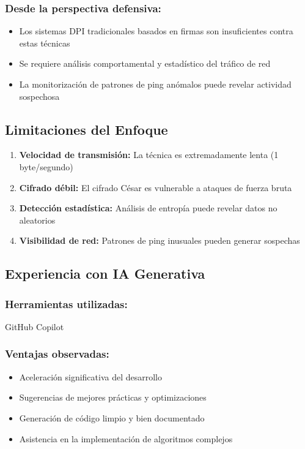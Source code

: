 \documentclass[letter,12pt]{article}
\begin{document}
\subsubsection*{Desde la perspectiva defensiva:}
\begin{itemize}
    \item Los sistemas DPI tradicionales basados en firmas son insuficientes contra estas técnicas
    \item Se requiere análisis comportamental y estadístico del tráfico de red
    \item La monitorización de patrones de ping anómalos puede revelar actividad sospechosa
\end{itemize}

\subsection*{Limitaciones del Enfoque}

\begin{enumerate}
    \item \textbf{Velocidad de transmisión:} La técnica es extremadamente lenta (1 byte/segundo)
    \item \textbf{Cifrado débil:} El cifrado César es vulnerable a ataques de fuerza bruta
    \item \textbf{Detección estadística:} Análisis de entropía puede revelar datos no aleatorios
    \item \textbf{Visibilidad de red:} Patrones de ping inusuales pueden generar sospechas
\end{enumerate}

\subsection*{Experiencia con IA Generativa}

\subsubsection*{Herramientas utilizadas:} GitHub Copilot

\subsubsection*{Ventajas observadas:}
\begin{itemize}
    \item Aceleración significativa del desarrollo
    \item Sugerencias de mejores prácticas y optimizaciones
    \item Generación de código limpio y bien documentado
    \item Asistencia en la implementación de algoritmos complejos
\end{itemize}
\end{document}
